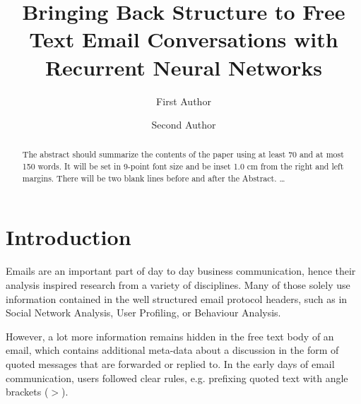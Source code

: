 \documentclass{llncs}
\begin{document}
%
\frontmatter          %
%
\pagestyle{headings}  %

\mainmatter              %
%
\title{Bringing Back Structure to Free Text Email Conversations with Recurrent Neural Networks}
%
%
\author{First Author \and Second Author}
%
%
%


\maketitle              %

\begin{abstract}
The abstract should summarize the contents of the paper
using at least 70 and at most 150 words. It will be set in 9-point
font size and be inset 1.0 cm from the right and left margins.
There will be two blank lines before and after the Abstract. \dots
\end{abstract}
%
\section{Introduction}
Emails are an important part of day to day business communication, hence their analysis inspired research from a variety of disciplines.
Many of those solely use information contained in the well structured email protocol headers, such as in Social Network Analysis, User Profiling, or Behaviour Analysis.

However, a lot more information remains hidden in the free text body of an email, which contains additional meta-data about a discussion in the form of quoted messages that are forwarded or replied to.
In the early days of email communication, users followed clear rules, e.g. prefixing quoted text with angle brackets ($>$).
\end{document}
